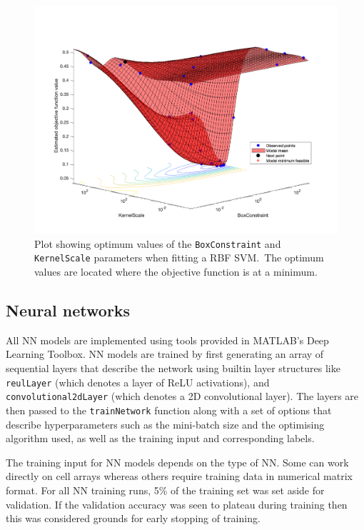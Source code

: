 \begin{figure}[ht]
  \centering
  \includegraphics[width=\textwidth]{figures/rbf_optim.png}
  \caption{Plot showing optimum values of the \texttt{BoxConstraint} and
  \texttt{KernelScale} parameters when fitting a RBF SVM.\ The optimum values
are located where the objective function is at a
minimum.}\label{fig:rbf_optim}
\end{figure}

\subsection{Neural networks}

All NN models are implemented using tools provided in MATLAB's Deep
Learning Toolbox. NN models are trained by first generating an array of
sequential layers that describe the network using builtin layer structures like
\texttt{reulLayer} (which denotes a layer of ReLU activations), and
\texttt{convolutional2dLayer} (which denotes a 2D convolutional layer). The
layers are then passed to the \texttt{trainNetwork} function along with a set of
options that describe hyperparameters such as the mini-batch size and the
optimising
algorithm used, as well as the training input and corresponding labels.

The training input for NN models depends on the type of NN\@. Some can work
directly on cell arrays whereas others require training data in numerical matrix
format. For all NN training runs, 5\% of the training set was set aside for
validation. If the validation accuracy was seen to plateau during training then
this was considered grounds for early stopping of training.

